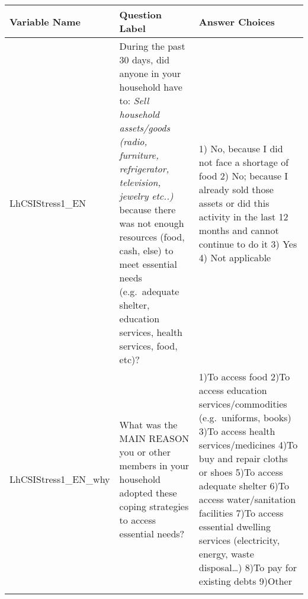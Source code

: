 \documentclass[
]{book}
\begin{document}
\begin{longtable}[]{@{}lll@{}}
\toprule
\begin{minipage}[b]{0.11\columnwidth}\raggedright
Variable Name\strut
\end{minipage} & \begin{minipage}[b]{0.37\columnwidth}\raggedright
Question Label\strut
\end{minipage} & \begin{minipage}[b]{0.43\columnwidth}\raggedright
Answer Choices\strut
\end{minipage}\tabularnewline
\midrule
\endhead
\begin{minipage}[t]{0.11\columnwidth}\raggedright
LhCSIStress1\_EN\strut
\end{minipage} & \begin{minipage}[t]{0.37\columnwidth}\raggedright
During the past 30 days, did anyone in your household have to: \emph{Sell household assets/goods (radio, furniture, refrigerator, television, jewelry etc..)} because there was not enough resources (food, cash, else) to meet essential needs (e.g.~adequate shelter, education services, health services, food, etc)?\strut
\end{minipage} & \begin{minipage}[t]{0.43\columnwidth}\raggedright
1) No, because I did not face a shortage of food 2) No; because I already sold those assets or did this activity in the last 12 months and cannot continue to do it 3) Yes 4) Not applicable\strut
\end{minipage}\tabularnewline
\begin{minipage}[t]{0.11\columnwidth}\raggedright
LhCSIStress1\_EN\_why\strut
\end{minipage} & \begin{minipage}[t]{0.37\columnwidth}\raggedright
What was the MAIN REASON you or other members in your household adopted these coping strategies to access essential needs?\strut
\end{minipage} & \begin{minipage}[t]{0.43\columnwidth}\raggedright
1)To access food 2)To access education services/commodities (e.g.~uniforms, books) 3)To access health services/medicines 4)To buy and repair cloths or shoes 5)To access adequate shelter 6)To access water/sanitation facilities 7)To access essential dwelling services (electricity, energy, waste disposal\ldots) 8)To pay for existing debts 9)Other\strut
\end{minipage}\tabularnewline
\begin{minipage}[t]{0.11\columnwidth}\raggedright

\end{minipage}
\end{longtable}
\end{document}
